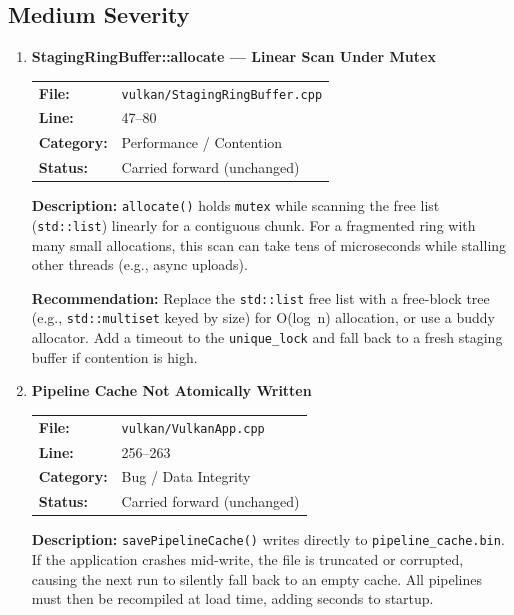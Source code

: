 \documentclass[a4paper,12pt]{article}
\newcommand{\severitybox}[2]{%
  \colorbox{#1}{\makebox[2.5cm][c]{\textcolor{white}{\textbf{#2}}}}%
}
\begin{document}
\newpage

\subsection{Medium Severity}

\begin{enumerate}[leftmargin=*]

\item[\textbf{[P9]}] \textbf{StagingRingBuffer::allocate — Linear Scan Under Mutex}
  \hfill \severitybox{mediumcolor}{MEDIUM}

  \begin{tabular}{ll}
    \textbf{File:} & \texttt{vulkan/StagingRingBuffer.cpp} \\
    \textbf{Line:} & 47--80 \\
    \textbf{Category:} & Performance / Contention \\
    \textbf{Status:} & Carried forward (unchanged) \\
  \end{tabular}

  \textbf{Description:}
  \texttt{allocate()} holds \texttt{mutex} while scanning the free list
  (\texttt{std::list}) linearly for a contiguous chunk. For a fragmented
  ring with many small allocations, this scan can take tens of microseconds
  while stalling other threads (e.g., async uploads).

  \textbf{Recommendation:}
  Replace the \texttt{std::list} free list with a free-block tree
  (e.g., \texttt{std::multiset} keyed by size) for O(log~n) allocation,
  or use a buddy allocator. Add a timeout to the \texttt{unique\_lock} and
  fall back to a fresh staging buffer if contention is high.

\item[\textbf{[B11]}] \textbf{Pipeline Cache Not Atomically Written}
  \hfill \severitybox{mediumcolor}{MEDIUM}

  \begin{tabular}{ll}
    \textbf{File:} & \texttt{vulkan/VulkanApp.cpp} \\
    \textbf{Line:} & 256--263 \\
    \textbf{Category:} & Bug / Data Integrity \\
    \textbf{Status:} & Carried forward (unchanged) \\
  \end{tabular}

  \textbf{Description:}
  \texttt{savePipelineCache()} writes directly to
  \texttt{pipeline\_cache.bin}. If the application crashes mid-write, the
  file is truncated or corrupted, causing the next run to silently fall back
  to an empty cache. All pipelines must then be recompiled at load time, adding
  seconds to startup.


\end{enumerate}
\end{document}
